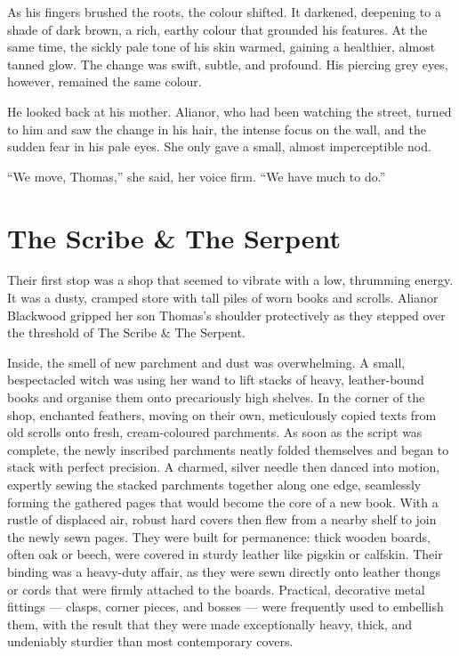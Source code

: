 As his fingers brushed the roots, the colour {shifted}. It darkened, deepening to a shade of dark brown, a rich, earthy colour that grounded his features. At the same time, the sickly pale tone of his skin warmed, gaining a healthier, almost tanned glow. The change was swift, subtle, and profound. His piercing grey eyes, however, remained the same colour.

He looked back at his mother. Alianor, who had been watching the street, turned to him and saw the change in his hair, the intense focus on the wall, and the sudden fear in his pale eyes. She only gave a small, almost imperceptible nod.

\enquote{We move, Thomas,} she said, her voice firm. \enquote{We have much to do.}



\section*{The Scribe \& The Serpent}
 
Their first stop was a shop that seemed to vibrate with a low, thrumming energy. It was a dusty, cramped store with tall piles of worn books and scrolls. Alianor Blackwood gripped her son Thomas's shoulder protectively as they stepped over the threshold of The Scribe \& The Serpent.
 
Inside, the smell of new parchment and dust was overwhelming. A small, bespectacled witch was using her wand to lift stacks of heavy, leather-bound books and organise them onto precariously high shelves. In the corner of the shop, enchanted feathers, moving on their own, meticulously copied texts from old scrolls onto fresh, cream-coloured parchments. As soon as the script was complete, the newly inscribed parchments neatly folded themselves and began to stack with perfect precision. A charmed, silver needle then danced into motion, expertly sewing the stacked parchments together along one edge, seamlessly forming the gathered pages that would become the core of a new book. With a rustle of displaced air, robust hard covers then flew from a nearby shelf to join the newly sewn pages. They were built for permanence: thick wooden boards, often oak or beech, were covered in sturdy leather like pigskin or calfskin. Their binding was a heavy-duty affair, as they were sewn directly onto leather thongs or cords that were firmly attached to the boards. Practical, decorative metal fittings --- clasps, corner pieces, and bosses --- were frequently used to embellish them, with the result that they were made exceptionally heavy, thick, and undeniably sturdier than most contemporary covers.
 
